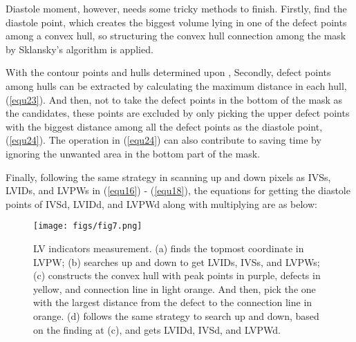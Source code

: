 \documentclass{article}
\begin{document}
\useshortskip

\useshortskip

\useshortskip

\useshortskip

\useshortskip

\useshortskip

\useshortskip

Diastole moment, however, needs some tricky methods to finish. Firstly, find the diastole point, which creates the biggest volume lying in one of the defect points among a convex hull, so structuring the convex hull connection among the mask by Sklansky's algorithm \cite{sklansky1982finding} is applied.
\useshortskip

With the contour points and hulls determined upon , Secondly, defect points among hulls can be extracted by calculating the maximum distance in each hull, (\ref{equ23}). And then, not to take the defect points in the bottom of the mask as the candidates, these points are excluded by only picking the upper defect points with the biggest distance among all the defect points as the diastole point, (\ref{equ24}). The operation in (\ref{equ24}) can also contribute to saving time by ignoring the unwanted area in the bottom part of the mask. 
\useshortskip

\useshortskip

Finally, following the same strategy in scanning up and down pixels as IVSs, LVIDs, and LVPWs in (\ref{equ16}) - (\ref{equ18}), the equations for getting the diastole points of IVSd, LVIDd, and LVPWd along with multiplying  are as below:
\begin{figure}[!t]
    \centering
    \texttt{[image: figs/fig7.png]}
    \caption{LV indicators measurement. (a) finds the topmost coordinate in LVPW; (b) searches up and down to get LVIDs, IVSs, and LVPWs; (c) constructs the convex hull with peak points in purple, defects in yellow, and connection line in light orange. And then, pick the one with the largest distance from the defect to the connection line in orange. (d) follows the same strategy to search up and down, based on the finding at (c), and gets LVIDd, IVSd, and LVPWd.}
    \label{fig7}
\end{figure}

\useshortskip

\useshortskip

\useshortskip

\useshortskip

\useshortskip
\end{document}
